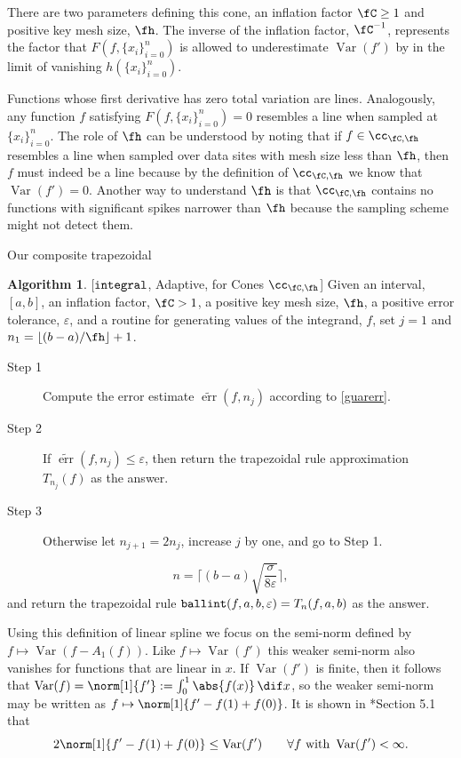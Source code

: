 \documentclass[]{article}
\DeclareMathOperator{\integ}{\texttt{\textup{integral}}}
\DeclareMathOperator{\ballinteg}{\texttt{\textup{ballint}}}
\DeclareMathOperator{\Var}{Var}
\DeclareMathOperator{\err}{err}
\newcommand{\terr}{\widetilde{\err}}
\theoremstyle{definition}
\newtheorem{algo}{Algorithm}
\theoremstyle{remark}
\newcommand{\datasites}{\{x_i\}_{i=0}^n}
\begin{document}
There are two parameters defining this cone, an inflation factor $\fC \ge 1$ and positive key mesh size, $\fh$.  The inverse of the inflation factor, $\fC^{-1}$, represents the factor that $F(f,\datasites)$ is allowed to underestimate $\Var(f')$ by in the limit of vanishing $h(\datasites)$.  

Functions whose first derivative has zero total variation are lines.  Analogously, any function $f$ satisfying $F(f,\datasites)=0$ resembles a line when sampled at $\datasites$.  The role of $\fh$ can be understood by noting that if $f\in \cc_{\fC,\fh}$ resembles a line when sampled over data sites with mesh size less than $\fh$, then $f$ must indeed be a line because by the definition of $\cc_{\fC,\fh}$ we know that $\Var(f')=0$. Another way to understand $\fh$ is that $\cc_{\fC,\fh}$ contains no functions with significant spikes narrower than $\fh$ because the sampling scheme might not detect them.

Our composite trapezoidal 

\begin{algo}\label{adaptintegalgo} [$\integ$, Adaptive, for Cones $\cc_{\fC,\fh}$] Given an interval, $[a,b]$, an inflation factor, $\fC>1$, a positive key mesh size, $\fh$, a positive error tolerance, $\varepsilon$, and a routine for generating values of the integrand, $f$, set $j=1$ and $n_1 = \left \lfloor (b-a)/\fh \right \rfloor +1$.
\begin{description}
\item[Step 1] Compute the error estimate $\terr(f,n_j)$ according to \eqref{guarerr}.

\item [Step 2] If $\terr(f,n_j) \le \varepsilon$, then return the trapezoidal rule approximation $T_{n_j}(f)$ as the answer.  

\item [Step 3] Otherwise let $n_{j+1}=2 n_j$, increase $j$ by one, and go to Step 1.

\end{description}
\begin{equation}\label{algo1n}
n = \Bigg \lceil (b-a)\sqrt{\frac{\sigma}{8\varepsilon}} \Bigg \rceil,
\end{equation}
and return the trapezoidal rule $\ballinteg(f,a,b,\varepsilon)=T_n(f,a,b)$ as the answer.
\end{algo}
Using this definition of linear spline we focus on the semi-norm defined by $f \mapsto \Var(f-A_1(f))$.  Like $f \mapsto \Var(f')$ this weaker semi-norm also vanishes for functions that are linear in $x$.  If $\Var(f')$ is finite, then it follows that $\Var(f) = \norm[1]{f'}:=\int_0^1 \abs{f(x)} \, \dif x$, so the weaker semi-norm may be written as $f \mapsto \norm[1]{f'-f(1)+f(0)}$.  It is shown in *{Section 5.1} that 
\begin{equation} \label{weaknorm}
2 \norm[1]{f'-f(1)+f(0)} \le \Var(f') \qquad \forall f \text{ with } \Var(f')<\infty.
\end{equation}
\end{document}
